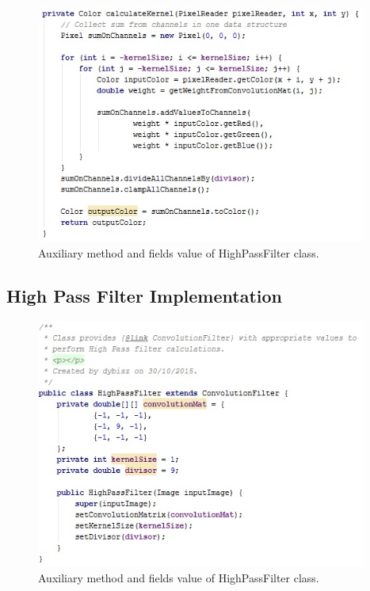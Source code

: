 \documentclass{article}
\begin{document}
\begin{figure}[H]
	\centering
	\includegraphics[width=0.97\textwidth]{_Figures/conv_filter_kernel.jpg}
    \caption{Auxiliary method and fields value of HighPassFilter class.}
    \label{fig:code:treshold_func}
\end{figure}


%
%
\subsection{High Pass Filter Implementation}
\begin{figure}[H]
	\centering
	\includegraphics[width=0.97\textwidth]{_Figures/highpass_class.jpg}
    \caption{Auxiliary method and fields value of HighPassFilter class.}
    \label{fig:code:treshold_func}
\end{figure}
\end{document}
